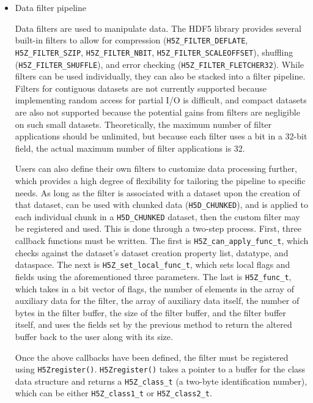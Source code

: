 
\begin{itemize}
    \item Data filter pipeline

Data filters are used to manipulate data. The HDF5 library provides several built-in filters to allow for compression ({\footnotesize\texttt{H5Z\_FILTER\_DEFLATE}, \texttt{H5Z\_FILTER\_SZIP}, \texttt{H5Z\_FILTER\_NBIT}, \texttt{H5Z\_FILTER\_SCALEOFFSET}}), shuffling ({\footnotesize\texttt{H5Z\_FILTER\_SHUFFLE}}), and error checking ({\footnotesize\texttt{H5Z\_FILTER\_FLETCHER32}}). While filters can be used individually, they can also be stacked into a filter pipeline. Filters for contiguous datasets are not currently supported because implementing random access for partial I/O is difficult, and compact datasets are also not supported because the potential gains from filters are negligible on such small datasets. Theoretically, the maximum number of filter applications should be unlimited, but because each filter uses a bit in a 32-bit field, the actual maximum number of filter applications is 32. 

Users can also define their own filters to customize data processing further, which provides a high degree of flexibility for tailoring the pipeline to specific needs. As long as the filter is associated with a dataset upon the creation of that dataset, can be used with chunked data (\texttt{H5D\_CHUNKED}), and is applied to each individual chunk in a \texttt{H5D\_CHUNKED} dataset, then the custom filter may be registered and used. This is done through a two-step process. First, three callback functions must be written. The first is \texttt{H5Z\_can\_apply\_func\_t}, which checks against the dataset's dataset creation property list, datatype, and dataspace. The next is \texttt{H5Z\_set\_local\_func\_t}, which sets local flags and fields using the aforementioned three parameters. The last is \texttt{H5Z\_func\_t}, which takes in a bit vector of flags, the number of elements in the array of auxiliary data for the filter, the array of auxiliary data itself, the number of bytes in the filter buffer, the size of the filter buffer, and the filter buffer itself, and uses the fields set by the previous method to return the altered buffer back to the user along with its size. 

Once the above callbacks have been defined, the filter must be registered using \texttt{H5Zregister()}. \texttt{H5Zregister()} takes a pointer to a buffer for the class data structure and returns a \texttt{H5Z\_class\_t} (a two-byte identification number), which can be either \texttt{H5Z\_class1\_t} or \texttt{H5Z\_class2\_t}. 


\end{itemize}
